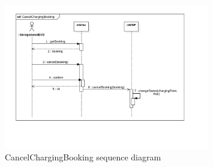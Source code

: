 \begin{figure}[H]
    \centering
    \includegraphics[width= 0.8\textwidth, trim={1.5cm 3.5cm 3cm 0}, clip]{Images/cp3/seqDiagrams/CancelChargingBooking.pdf}
    \caption{CancelChargingBooking sequence diagram}
\end{figure}

